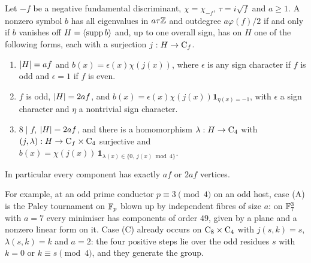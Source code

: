 \begin{theorem}\label{grw:thm:cayleyequality}
Let $-f$ be a negative fundamental discriminant, $\chi=\chi_{-f}$,
$\tau=i\sqrt f$ and $a\ge1$. A nonzero symbol $b$ has all eigenvalues in
$a\tau\mathbb{Z}$ and outdegree $a\varphi(f)/2$ if and only if $b$ vanishes off
$H=\langle\operatorname{supp} b\rangle$ and, up to one overall sign, has on $H$ one of
the following forms, each with a surjection $j:H\to\mathrm{C}_f$.
\begin{enumerate}[label=\textup{(\Alph*)}]
\item $\lvert H\rvert=af$ and $b(x)=\epsilon(x)\chi(j(x))$, where $\epsilon$ is
any sign character if $f$ is odd and $\epsilon=1$ if $f$ is even.
\item $f$ is odd, $\lvert H\rvert=2af$, and
$b(x)=\epsilon(x)\chi(j(x))\mathbf 1_{\eta(x)=-1}$, with $\epsilon$ a sign
character and $\eta$ a nontrivial sign character.
\item $8\mid f$, $\lvert H\rvert=2af$, and there is a homomorphism
$\lambda:H\to\mathrm{C}_4$ with $(j,\lambda):H\to\mathrm{C}_f\times\mathrm{C}_4$
surjective and
$b(x)=\chi(j(x))\,\mathbf 1_{\lambda(x)\in\{0,\ j(x)\bmod4\}}$.
\end{enumerate}
In particular every component has exactly $af$ or $2af$ vertices.
\end{theorem}


For example, at an odd prime conductor $p\equiv3\pmod4$ on an odd host,
case (A) is the Paley tournament on $\mathbb{F}_p$ blown up by independent fibres
of size $a$: on $\mathbb{F}_7^3$ with $a=7$ every minimiser has components of
order $49$, given by a plane and a nonzero linear form on it. Case (C)
already occurs on $\mathrm{C}_8\times\mathrm{C}_4$ with $j(s,k)=s$,
$\lambda(s,k)=k$ and $a=2$: the four positive steps lie over the odd
residues $s$ with $k=0$ or $k\equiv s\pmod4$, and they generate the group.

